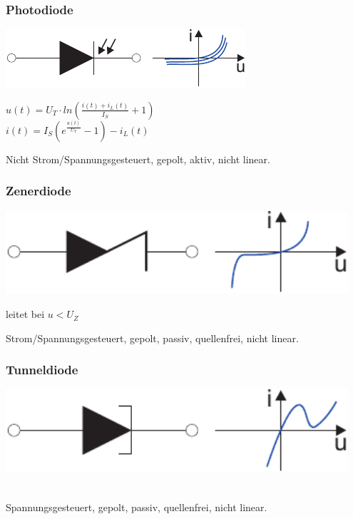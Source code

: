 \documentclass[a4paper,twocolumn,10pt]{article}
\begin{document}
\subsubsection*{Photodiode}
\begin{minipage}[b]{0.24\textwidth}
\includegraphics[width=\textwidth]{img/Photodiode}
\end{minipage}
\hfill
\begin{minipage}[b]{0.22\textwidth}
$u(t)=U_T\cdot ln(\frac{i(t)+i_L(t)}{I_S}+1)$\\
$i(t)=I_S(e^{\frac{u(t)}{U_T}}-1)-i_L(t)$
\end{minipage}
Nicht Strom/Spannungsgesteuert, gepolt, aktiv, nicht linear.

\subsubsection*{Zenerdiode}
\begin{minipage}[b]{0.26\textwidth}
\includegraphics[width=0.95\textwidth]{img/Z-Diode}
\end{minipage}
\hfill
\begin{minipage}[b]{0.2\textwidth}
leitet bei $u<U_Z$
\end{minipage}
Strom/Spannungsgesteuert, gepolt, passiv, quellenfrei, nicht linear.

\subsubsection*{Tunneldiode}
\begin{minipage}[b]{0.26\textwidth}
\includegraphics[width=0.95\textwidth]{img/Tunneldiode}
\end{minipage}
\\
Spannungsgesteuert, gepolt, passiv, quellenfrei, nicht linear.
\end{document}
